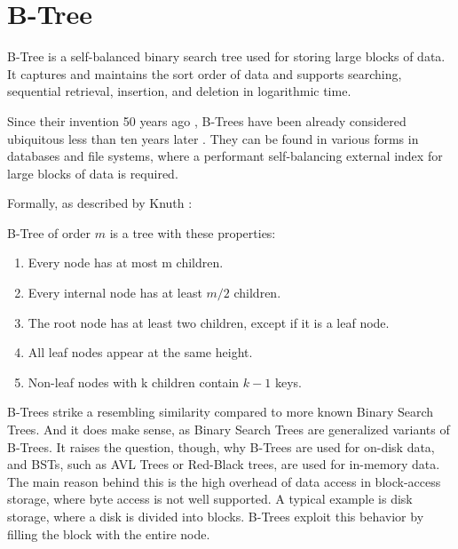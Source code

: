 \section{B-Tree}

B-Tree is a self-balanced binary search tree used for storing large blocks of data. It captures and maintains the sort order of data and supports searching, sequential retrieval, insertion, and deletion in logarithmic time.

Since their invention 50 years ago \cite{bayer-org}, B-Trees have been already considered ubiquitous less than ten years later \cite{10.1145/356770.356776}. They can be found in various forms in databases and file systems, where a performant self-balancing external index for large blocks of data is required.

Formally, as described by Knuth \cite{knuth1998art}:

\begin{definition}[B-Tree]\label{def:btree}
  B-Tree of order $m$ is a tree with these properties:
  \begin{enumerate}
    \item Every node has at most m children.
    \item Every internal node has at least $m/2$ children.
    \item The root node has at least two children, except if it is a leaf node.
    \item All leaf nodes appear at the same height.
    \item Non-leaf nodes with k children contain $k - 1$ keys.
  \end{enumerate}
\end{definition}





B-Trees strike a resembling similarity compared to more known Binary Search Trees. And it does make sense, as Binary Search Trees are generalized variants of B-Trees. It raises the question, though, why B-Trees are used for on-disk data, and BSTs, such as AVL Trees or Red-Black trees, are used for in-memory data. The main reason behind this is the high overhead of data access in block-access storage, where byte access is not well supported. A typical example is disk storage, where a disk is divided into blocks. B-Trees exploit this behavior by filling the block with the entire node.

